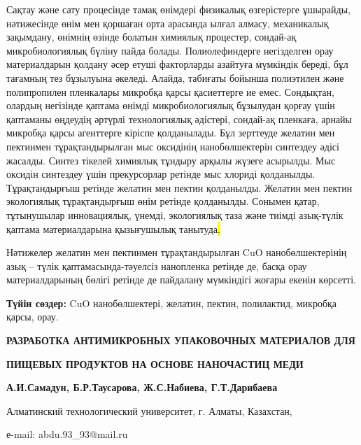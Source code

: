 Сақтау және сату процесінде тамақ өнімдері физикалық өзгерістерге
ұшырайды, нәтижесінде өнім мен қоршаған орта арасында ылғал алмасу,
механикалық зақымдану, өнімнің өзінде болатын химиялық процестер,
сондай-ақ микробиологиялық бүліну пайда болады. Полиолефиндерге
негізделген орау материалдарын қолдану әсер етуші факторларды азайтуға
мүмкіндік береді, бұл тағамның тез бұзылуына әкеледі. Алайда, табиғаты
бойынша полиэтилен және полипропилен пленкалары микробқа қарсы
қасиеттерге ие емес. Сондықтан, олардың негізінде қаптама өнімді
микробиологиялық бұзылудан қорғау үшін қаптаманы өңдеудің әртүрлі
технологиялық әдістері, сондай-ақ пленкаға, арнайы микробқа қарсы
агенттерге кіріспе қолданылады. Бұл зерттеуде желатин мен пектинмен
тұрақтандырылған мыс оксидінің нанобөлшектерін синтездеу әдісі жасалды.
Синтез тікелей химиялық тұндыру арқылы жүзеге асырылды. Мыс оксидін
синтездеу үшін прекурсорлар ретінде мыс хлориді қолданылды.
Тұрақтандырғыш ретінде желатин мен пектин қолданылды. Желатин мен пектин
экологиялық тұрақтандырғыш өнім ретінде қолданылды. Сонымен қатар,
тұтынушылар инновациялық, үнемді, экологиялық таза және тиімді
азық-түлік қаптама материалдарына қызығушылық танытуда\hl{.}

Нәтижелер желатин мен пектинмен тұрақтандырылған CuO нанобөлшектерінің
азық -- түлік қаптамасында-тәуелсіз нанопленка ретінде де, басқа орау
материалдарының бөлігі ретінде де пайдалану мүмкіндігі жоғары екенін
көрсетті.

{\bfseries Түйін сөздер:} CuO нанобөлшектері, желатин, пектин, полилактид,
микробқа қарсы, орау.

{\bfseries РАЗРАБОТКА АНТИМИКРОБНЫХ УПАКОВОЧНЫХ МАТЕРИАЛОВ ДЛЯ}

{\bfseries ПИЩЕВЫХ ПРОДУКТОВ НА ОСНОВЕ НАНОЧАСТИЦ МЕДИ}

{\bfseries А.И.Самадун, Б.Р.Таусарова, Ж.С.Набиева, Г.Т.Дарибаева}

Алматинский технологический университет, г. Алматы, Казахстан,

е-mail: abdu.93\_93@mail.ru

